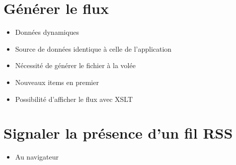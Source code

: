 \begin{english}
\begin{Shaded}
\begin{Highlighting}[]
\end{Highlighting}
\end{Shaded}

\end{english}

\hypertarget{guxe9nuxe9rer-le-flux}{%
\section{Générer le flux}\label{guxe9nuxe9rer-le-flux}}

\begin{itemize}
\tightlist
\item
  Données dynamiques
\item
  Source de données identique à celle de l'application
\item
  Nécessité de générer le fichier à la volée
\item
  Nouveaux items en premier
\item
  Possibilité d'afficher le flux avec XSLT
\end{itemize}

\hypertarget{signaler-la-pruxe9sence-dun-fil-rss}{%
\section{Signaler la présence d'un fil
RSS}\label{signaler-la-pruxe9sence-dun-fil-rss}}

\begin{itemize}
\tightlist
\item
  Au navigateur
\end{itemize}

\begin{english}

\begin{Shaded}
\begin{Highlighting}[]
\KeywordTok{\textgreater{}}
\end{Highlighting}
\end{Shaded}

\end{english}

